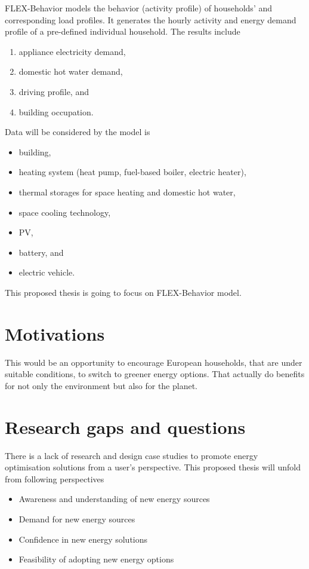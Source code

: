 FLEX-Behavior models the behavior (activity profile) of households' and corresponding load profiles. 
It generates the hourly activity and energy demand profile of a pre-defined individual household. 
The results include

\begin{enumerate}
  \item appliance electricity demand,
  \item domestic hot water demand,
  \item driving profile, and
  \item building occupation.
\end{enumerate}

Data will be considered by the model is

\begin{itemize}
  \item building,
  \item heating system (heat pump, fuel-based boiler, electric heater),
  \item thermal storages for space heating and domestic hot water,
  \item space cooling technology,
  \item PV,
  \item battery, and
  \item electric vehicle.
\end{itemize}

This proposed thesis is going to focus on FLEX-Behavior model. 

\section{Motivations}

This would be an opportunity to encourage European households, that are under suitable conditions, to switch to greener energy options. 
That actually do benefits for not only the environment but also for the planet. 

\section{Research gaps and questions}

There is a lack of research and design case studies to promote energy optimisation solutions from a user's perspective. 
This proposed thesis will unfold from following perspectives

\begin{itemize}
  \item Awareness and understanding of new energy sources
  \item Demand for new energy sources
  \item Confidence in new energy solutions
  \item Feasibility of adopting new energy options
\end{itemize}

